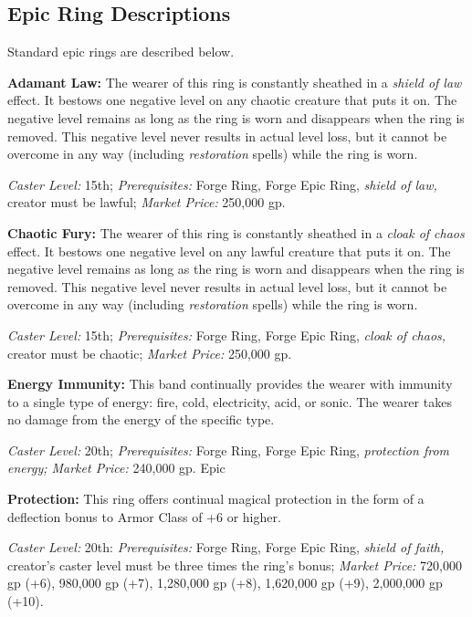 \documentclass{article}
\begin{document}
\subsection*{Epic Ring Descriptions }

Standard epic rings are described below.

\vspace{12pt}
\textbf{Adamant Law:  }The wearer of this ring is constantly sheathed in a \textit{shield 
of law }effect. It bestows one negative level on any chaotic creature that puts 
it on. The negative level remains as long as the ring is worn and disappears when 
the ring is removed. This negative level never results in actual level loss, but 
it cannot be overcome in any way (including \textit{restoration }spells) while 
the ring is worn. 

\textit{Caster Level: }15th; \textit{Prerequisites: }Forge Ring, Forge Epic Ring, 
\textit{shield of law, }creator must be lawful; \textit{Market Price: }250,000 
gp. 

\textbf{Chaotic Fury: }The wearer of this ring is constantly sheathed in a \textit{cloak 
of chaos }effect. It bestows one negative level on any lawful creature that puts 
it on. The negative level remains as long as the ring is worn and disappears when 
the ring is removed. This negative level never results in actual level loss, but 
it cannot be overcome in any way (including \textit{restoration }spells) while 
the ring is worn. 

\textit{Caster Level: }15th; \textit{Prerequisites: }Forge Ring, Forge Epic Ring, 
\textit{cloak of chaos, }creator must be chaotic; \textit{Market Price: }250,000 
gp. 

\textbf{Energy Immunity: }This band continually provides the wearer with immunity 
to a single type of energy: fire, cold, electricity, acid, or sonic. The wearer 
takes no damage from the energy of the specific type. 

\textit{Caster Level: }20th; \textit{Prerequisites: }Forge Ring, Forge Epic Ring, 
\textit{protection from energy; Market Price: }240,000 gp. Epic 

\textbf{Protection: }This ring offers continual magical protection in the form 
of a deflection bonus to Armor Class of +6 or higher. 

\textit{Caster Level: }20th: \textit{Prerequisites: }Forge Ring, Forge Epic Ring, 
\textit{shield of faith, }creator's caster level must be three times the ring's 
bonus; \textit{Market Price: }720,000 gp (+6), 980,000 gp (+7), 1,280,000 gp (+8), 
1,620,000 gp (+9), 2,000,000 gp (+10). 
\end{document}
